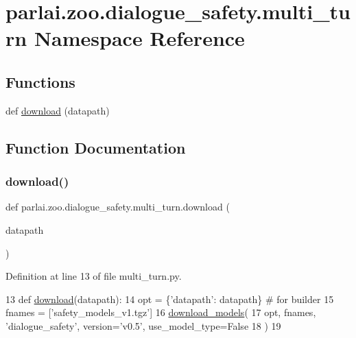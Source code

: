 \hypertarget{namespaceparlai_1_1zoo_1_1dialogue__safety_1_1multi__turn}{}\section{parlai.\+zoo.\+dialogue\+\_\+safety.\+multi\+\_\+turn Namespace Reference}
\label{namespaceparlai_1_1zoo_1_1dialogue__safety_1_1multi__turn}
\subsection*{Functions}
\begin{DoxyCompactItemize}
\item 
def \hyperlink{namespaceparlai_1_1zoo_1_1dialogue__safety_1_1multi__turn_ae081830ac93e63d15483d78b7417cf45}{download} (datapath)
\end{DoxyCompactItemize}


\subsection{Function Documentation}
\mbox{\label{namespaceparlai_1_1zoo_1_1dialogue__safety_1_1multi__turn_ae081830ac93e63d15483d78b7417cf45}} 
\subsubsection{\texorpdfstring{download()}{download()}}
{\footnotesize\ttfamily def parlai.\+zoo.\+dialogue\+\_\+safety.\+multi\+\_\+turn.\+download (\begin{DoxyParamCaption}\item[{}]{datapath }\end{DoxyParamCaption})}



Definition at line 13 of file multi\+\_\+turn.\+py.


\begin{DoxyCode}
13 \textcolor{keyword}{def }\hyperlink{namespaceparlai_1_1zoo_1_1dialogue__safety_1_1multi__turn_ae081830ac93e63d15483d78b7417cf45}{download}(datapath):
14     opt = \{\textcolor{stringliteral}{'datapath'}: datapath\}  \textcolor{comment}{# for builder}
15     fnames = [\textcolor{stringliteral}{'safety\_models\_v1.tgz'}]
16     \hyperlink{namespaceparlai_1_1core_1_1build__data_ab697f23f05d3e36d7979fe5e0ed7911e}{download\_models}(
17         opt, fnames, \textcolor{stringliteral}{'dialogue\_safety'}, version=\textcolor{stringliteral}{'v0.5'}, use\_model\_type=\textcolor{keyword}{False}
18     )
19 \end{DoxyCode}
